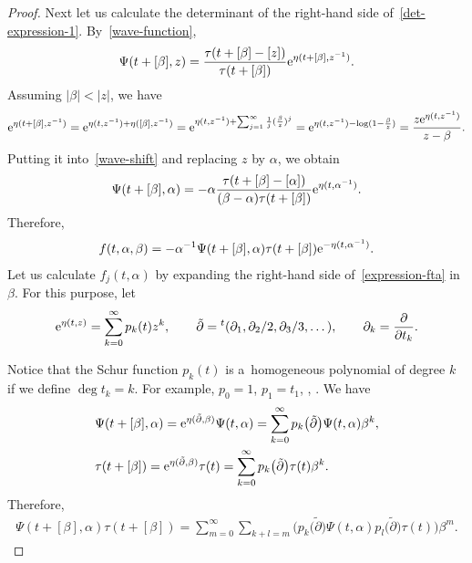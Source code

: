 \documentclass[10pt,a4paper]{amsart}
\numberwithin{equation}{section}
\theoremstyle{definition}
\begin{document}
\begin{proof}
Next let us calculate the determinant of the right-hand side of~\eqref{det-expression-1}.
By~\eqref{wave-function},
\begin{gather}
\Psi(t+[\beta],z)=\frac{\tau(t+[\beta]-[z])}{\tau(t+[\beta])}{\rm e}^{\eta(t+[\beta],z^{-1})}.
\label{wave-shift}
\end{gather}
Assuming $|\beta|<|z|$, we have
\begin{align*}
{\rm e}^{\eta(t+[\beta],z^{-1})}
=
{\rm e}^{\eta(t,z^{-1})+\eta([\beta],z^{-1})}
=
{\rm e}^{\eta(t,z^{-1})+\sum_{j=1}^\infty \frac{1}{j}(\frac{\beta}{z})^j}
=
{\rm e}^{\eta(t,z^{-1})-\log(1-\frac{\beta}{z})}
=
\frac{z{\rm e}^{\eta(t,z^{-1})}}{z-\beta}.
\end{align*}
Putting it into~\eqref{wave-shift} and replacing $z$ by $\alpha$, we obtain
\begin{gather*}
\Psi(t+[\beta],\alpha)=-\alpha \frac{\tau(t+[\beta]-[\alpha])}{(\beta-\alpha)\tau(t+[\beta])}
{\rm e}^{\eta(t,\alpha^{-1})}.
\end{gather*}
Therefore, \begin{gather}
f(t,\alpha,\beta)=-\alpha^{-1}\Psi(t+[\beta],\alpha)\tau(t+[\beta]){\rm e}^{-\eta(t,\alpha^{-1})}.
\label{expression-fta}
\end{gather}
Let us calculate $f_j(t,\alpha)$ by expanding the right-hand side of~\eqref{expression-fta}
 in $\beta$.
For this purpose, let
\begin{gather}
{\rm e}^{\eta(t,z)}=\sum_{k=0}^\infty p_k(t) z^k,
\qquad
\tilde{\partial}={}^t(\partial_1,\partial_2/2,\partial_3/3,\dots ),
 \qquad \partial_k=\frac{\partial}{\partial t_k}.\label{def-pk}
\end{gather}

Notice that the Schur function $p_k(t)$ is a~homogeneous polynomial of degree $k$ if we define
$\deg t_k=k$. For example,
$
p_0=1$,
$
p_1=t_1$,
,
.
We have
\begin{gather*}
\begin{split}
& \Psi(t+[\beta],\alpha)
=
{\rm e}^{\eta(\tilde{\partial},\beta)}\Psi(t,\alpha)=
\sum_{k=0}^\infty p_k\bigl(\tilde{\partial}\bigr)\Psi(t,\alpha)\beta^k,
\\
& \tau(t+[\beta])
=
{\rm e}^{\eta(\tilde{\partial},\beta)}\tau(t)=
\sum_{k=0}^\infty p_k\bigl(\tilde{\partial}\bigr)\tau(t)\beta^k.
\end{split}
\end{gather*}
Therefore, \begin{gather}
\Psi(t+[\beta],\alpha)\tau(t+[\beta])
=\sum_{m=0}^\infty \sum_{k+l=m}
\bigl(p_k\bigl(\tilde{\partial}\bigr)\Psi(t,\alpha) p_l\bigl(\tilde{\partial}\bigr)\tau(t)\bigr)\beta^m.
\label{expansion-product}
\end{gather}




\end{proof}
\end{document}
